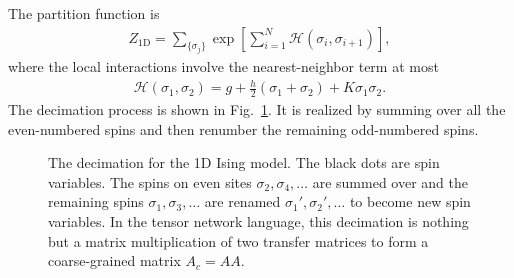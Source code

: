 \documentclass[aps,prr,reprint,superscriptaddress,floatfix]{revtex4-2}
\begin{document}
The partition function is
%
\begin{align}\label{def:Z4Ising1D}
    Z_{\text{1D}} = \sum_{\{\sigma_j \} } \exp{\left[\sum_{i=1}^N
    \mathscr{H}\left(\sigma_i,\sigma_{i+1}\right)  \right]},
\end{align}
%
where the local interactions involve the nearest-neighbor term at most
%
\begin{align}\label{def:H4Ising1D}
    \mathscr{H}\left(\sigma_1, \sigma_2\right) = g +
    \frac{h}{2}\left(\sigma_1 + \sigma_2\right) + K\sigma_1 \sigma_2.
\end{align}
%
The decimation process is shown in Fig.~\ref{fig:Ising1D-decimation}.
It is realized by summing over all the even-numbered spins and then
renumber the remaining odd-numbered spins. 
%
\begin{figure}[h]
    \caption{\label{fig:Ising1D-decimation}
        The decimation for the 1D Ising model. 
        The black dots are spin variables. 
        The spins on even sites $\sigma_2,\sigma_4,\ldots$ are summed over and the remaining spins $\sigma_1,\sigma_3,\ldots$ are renamed $\sigma_1',\sigma_2',\ldots$ to become new spin variables. 
        In the tensor network language, this decimation is nothing but a matrix multiplication of two transfer matrices to form a coarse-grained matrix $A_c = AA$.
    }
\end{figure}
%
\end{document}
